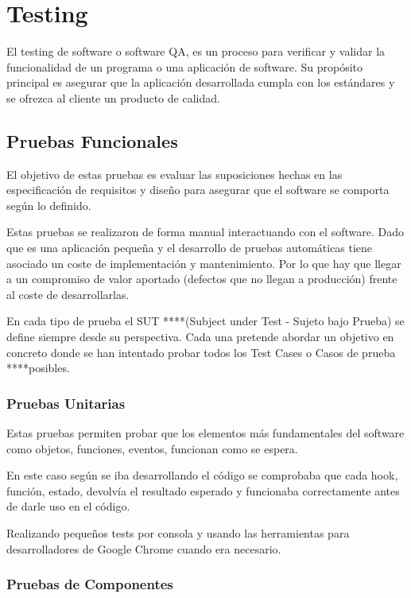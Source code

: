 \documentclass[12pt,twoside,titlepage]{report}
\begin{document}
\section{Testing}

El testing de software o software QA, es un proceso para verificar y validar la funcionalidad de un programa o una aplicación de software. Su propósito principal es asegurar que la aplicación desarrollada cumpla con los estándares y se ofrezca al cliente un producto de calidad.

\subsection{Pruebas Funcionales}

El objetivo de estas pruebas es evaluar las suposiciones hechas en las especificación de requisitos y diseño para asegurar que el software se comporta según lo definido.

Estas pruebas se realizaron de forma manual interactuando con el software. Dado que es una aplicación pequeña y el desarrollo de pruebas automáticas tiene asociado un coste de implementación y mantenimiento. Por lo que hay que llegar a un compromiso de valor aportado (defectos que no llegan a producción) frente al coste de desarrollarlas. 

En cada tipo de prueba el SUT ****(Subject under Test - Sujeto bajo Prueba) se define siempre desde su perspectiva. Cada una pretende abordar un objetivo en concreto donde se han intentado probar todos los Test Cases o Casos de prueba ****posibles.

\subsubsection{Pruebas Unitarias}

Estas pruebas permiten probar que los elementos más fundamentales del software como objetos, funciones, eventos, funcionan como se espera. 

En este caso según se iba desarrollando el código se comprobaba que cada hook, función, estado, devolvía el resultado esperado y funcionaba correctamente antes de darle uso en el código. 

Realizando pequeños tests por consola y usando las herramientas para desarrolladores de Google Chrome cuando era necesario.

\subsubsection{Pruebas de Componentes}
\end{document}
